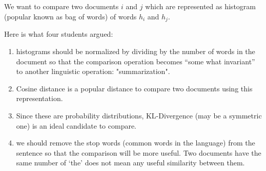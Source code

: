 \begin{frame}
\section{}
  We want to compare two documents $i$ and $j$ which are represented as histogram (popular known as bag of words) of words $h_i$ and $h_j$.

  Here is what four students argued:
     \begin{enumerate}[label=(\Alph*)]
      \item histograms should be normalized by dividing by the number of words in the document so that the comparison operation becomes ``some what invariant'' to another linguistic operation: "summarization". %
      \item Cosine distance is a popular distance to compare two documents using this  representation. %
      \item Since these are probability distributions, KL-Divergence  (may be a symmetric one) is an ideal candidate to compare. %
      \item we should remove the stop words (common words in the language) from the sentence so that the comparison will be more useful. Two documents have the same number of `the' does not mean any useful similarity between them. %
     \end{enumerate}
\end{frame}
